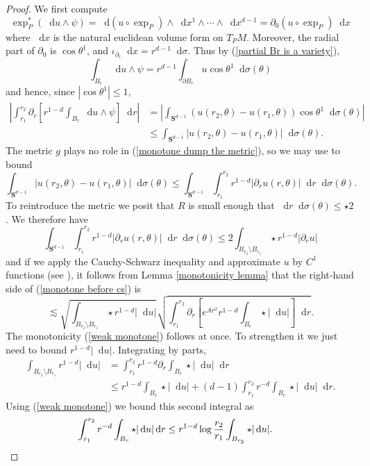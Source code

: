 \documentclass[reqno,12pt,letterpaper]{amsart}
\newcommand{\Sph}{\mathbf S}
\newcommand*\dif{\mathop{}\!\mathrm{d}}
\theoremstyle{definition}
\numberwithin{equation}{section}
\begin{document}
\begin{proof}
We first compute 
$$\exp_P^*(\dif u \wedge \psi) = \dif (u \circ \exp_P) \wedge \dif x^1 \wedge \cdots \wedge \dif x^{d - 1} = \partial_0 (u \circ \exp_P) \dif x$$
where $\dif x$ is the natural euclidean volume form on $T_PM$.
Moreover, the radial part of $\partial_0$ is $\cos \theta^1$, and $\iota_{\partial_r} \dif x = r^{d - 1} \dif \sigma$.
Thus by (\ref{partial Br is a variety}),
$$\int_{B_r} \dif u \wedge \psi = r^{d - 1}\int_{\partial B_r} u \cos \theta^1 \dif \sigma(\theta)$$
and hence, since $|\cos \theta^1| \leq 1$,
\begin{align}
\left|\int_{r_1}^{r_2} \partial_r \left[r^{1 - d}\int_{B_r} \dif u \wedge \psi\right] \dif r\right|
&= \left|\int_{\Sph^{d - 1}} (u(r_2, \theta) - u(r_1, \theta)) \cos \theta^1 \dif \sigma(\theta)\right| \\
&\leq \int_{\Sph^{d - 1}} |u(r_2, \theta) - u(r_1, \theta)| \dif \sigma(\theta). \label{monotone dump the metric}
\end{align}
The metric $g$ plays no role in (\ref{monotone dump the metric}), so we may use \cite[Lemma 5.3]{Giusti77} to bound
$$\int_{\Sph^{d - 1}} |u(r_2, \theta) - u(r_1, \theta)| \dif \sigma(\theta) \leq \int_{\Sph^{d - 1}} \int_{r_1}^{r_2} r^{1 - d}|\partial_r u(r, \theta)| \dif r \dif\sigma(\theta).$$
To reintroduce the metric we posit that $R$ is small enough that $\dif r \dif \sigma(\theta) \leq \star 2$.
We therefore have
\begin{equation}\label{monotone before cs}
\int_{\Sph^{d - 1}} \int_{r_1}^{r_2} r^{1 - d}|\partial_r u(r, \theta)| \dif r \dif\sigma(\theta) \leq 2 \int_{B_{r_2} \setminus B_{r_1}} \star r^{1 - d}|\partial_r u|
\end{equation}
and if we apply the Cauchy-Schwarz inequality and approximate $u$ by $C^1$ functions (see \cite[pg68]{Giusti77}), it follows from Lemma \ref{monotonicity lemma} that the right-hand side of (\ref{monotone before cs}) is
$$\lesssim \sqrt{\int_{B_{r_2} \setminus B_{r_1}} \star r^{1 - d} |\dif u|} \sqrt{\int_{r_1}^{r_2} \partial_r \left[e^{Ar^2} r^{1-d}\int_{B_r} \star |\dif u|\right] \dif r}.$$
The monotonicity (\ref{weak monotone}) follows at once. To strengthen it we just need to bound $r^{1 - d} |\dif u|$.
Integrating by parts,
\begin{align*}
\int_{B_{r_2} \setminus B_{r_1}} r^{1 - d} |\dif u| &= \int_{r_1}^{r_2} r^{1 - d} \partial_r \int_{B_r} \star |\dif u| \dif r \\
&\leq r^{1 - d} \int_{B_r} \star |\dif u| + (d - 1) \int_{r_1}^{r_2} r^{-d} \int_{B_r} \star |\dif u| \dif r.
\end{align*}
Using (\ref{weak monotone}) we bound this second integral as
\begin{align*}
\int_{r_1}^{r_2} r^{-d} \int_{B_r} \star |\dif u| \dif r &\leq r^{1 - d} \log \frac{r_2}{r_1} \int_{B_{r_2}} \star |\dif u|. \qedhere
\end{align*}
\end{proof}
\end{document}
